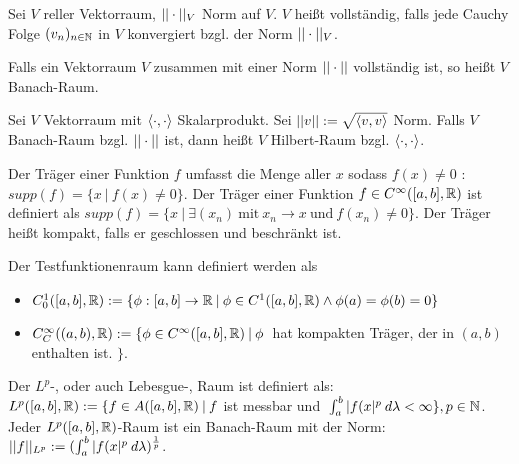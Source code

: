 \begin{definition}
		Sei $V$ reller Vektorraum, $|| \cdot ||_V$ Norm auf $V$. $V$ heißt vollständig, falls jede Cauchy Folge $(v_{n})_{n \in \mathbb{N}}$ in $V$ konvergiert bzgl. der Norm $|| \cdot ||_V$. 
\end{definition}

\begin{definition}
	Falls ein Vektorraum $V$ zusammen mit einer Norm $|| \cdot ||$ vollständig ist, so heißt $V$ Banach-Raum. 
\end{definition}

\begin{definition}
	Sei $V$ Vektorraum mit $\langle \cdot, \cdot \rangle $ Skalarprodukt. Sei $||v|| := \sqrt{\langle v, v \rangle}$ Norm. Falls $V$ Banach-Raum bzgl. $|| \cdot ||$ ist, dann heißt $V$ Hilbert-Raum bzgl. $\langle \cdot, \cdot \rangle$.
\end{definition}

\begin{definition}[Träger]
	Der Träger einer Funktion $f$ umfasst die Menge aller $x$ sodass $f(x) \neq 0$ : $supp(f) = \{ x \medspace | \medspace f(x) \neq 0 \}$. Der Träger einer Funktion $f \in C^{\infty}([a,b],\mathbb{R})$ ist definiert als $supp(f) = \{x \medspace | \medspace \exists(x_n) \medspace \text{mit} \medspace x_n \rightarrow x \medspace \text{und} \medspace f(x_n) \neq 0 \}$. Der Träger heißt kompakt, falls er geschlossen und beschränkt ist.
\end{definition}

\begin{definition}[Testfunktionenraum]
	Der Testfunktionenraum kann definiert werden als
	\begin{itemize}[noitemsep]
		\item $C_0^1([a,b],\mathbb{R}) := \{ \phi : [a,b] \rightarrow \mathbb{R} \medspace | \medspace \phi \in C^{1}([a,b],\mathbb{R}) \land \phi(a) = \phi(b) = 0 \}$
		\item $C_C^\infty((a,b),\mathbb{R}) := \{ \phi \in C^{\infty}([a,b],\mathbb{R}) \medspace | \medspace \phi \medspace$ hat kompakten Träger, der in $(a,b)$ enthalten ist.  $\}$.
	\end{itemize}
\end{definition}

\begin{definition}[$L^p$ - Raum]
	Der $L^p$-, oder auch Lebesgue-, Raum ist definiert als: $L^p([a,b], \mathbb{R}) := \{ f \in A([a,b],\mathbb{R}) \medspace | \medspace f $ ist messbar und $ \medspace \int_a^b |f(x|^p \medspace d\lambda < \infty \}, p \in \mathbb{N}$. Jeder $L^p([a,b],\mathbb{R})$-Raum ist ein Banach-Raum mit der Norm: $||f||_{L^p} := (\int_{a}^{b} |f(x|^p \medspace d \lambda )^\frac{1}{p}$.
\end{definition}

